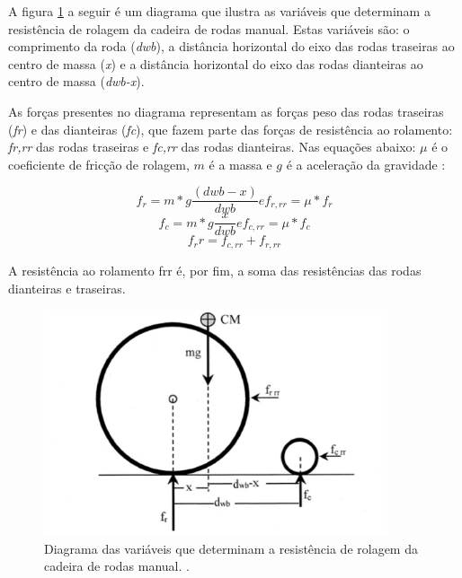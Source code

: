 A figura \ref{fig:diagrama_variaveis} a seguir é um diagrama que ilustra as variáveis que determinam a resistência de rolagem da cadeira de rodas manual. Estas variáveis são: o comprimento da roda (\textit{dwb}), a distância horizontal do eixo das rodas traseiras ao centro de massa (\textit{x}) e a distância horizontal do eixo das rodas dianteiras ao centro de massa (\textit{dwb-x}).

As forças presentes no diagrama representam as forças peso das rodas traseiras (\textit{fr}) e das dianteiras (\textit{fc}), que fazem parte das forças de resistência ao rolamento: \textit{fr,rr} das rodas traseiras e \textit{fc,rr} das rodas dianteiras. Nas equações abaixo: $\mu$ é o coeficiente de fricção de rolagem, $m$ é a massa e $g$ é a aceleração da gravidade \cite{propulsao_cadeira}:

\begin{equation}
f_r= m*g \frac{(dwb-x)}{dwb}   e  f_{r,rr}= \mu*f_r
\end{equation}
\begin{equation}
f_c=m*g \frac{x}{dwb}   e  f_{c,rr}= \mu*f_c
\end{equation}
\begin{equation}
f_rr=f_{c,rr}+ f_{r,rr}  
\end{equation}

A resistência ao rolamento frr é, por fim, a soma das resistências das rodas dianteiras e traseiras.

\begin{figure}[!htb]
\centering
\includegraphics[width = 0.9\textwidth]{figuras/resultados/diagrama_variaveis}
\caption{Diagrama das variáveis que determinam a resistência de rolagem da cadeira de rodas manual. \cite{propulsao_cadeira}.}
\label{fig:diagrama_variaveis}
\end{figure}

